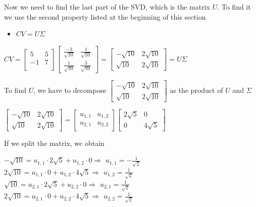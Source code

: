 Now we need to find the last part of the SVD, which is the matrix $ U $. To find it we use the second property listed at the beginning of this section\\
\begin{itemize}
	\item $CV=U\Sigma$
\end{itemize}
\begin{center}
	$ CV=\begin{bmatrix}
		5 &   5 \\
		-1  &  7 \\
	\end{bmatrix}\begin{bmatrix}
	\frac{-3}{\sqrt{10}} & \frac{1}{\sqrt{10}}\\
	\frac{1}{\sqrt{10}} &	\frac{3}{\sqrt{10}}
	\end{bmatrix}=\begin{bmatrix}
	-\sqrt{10} & 2\sqrt{10}\\
	\sqrt{10} &	2\sqrt{10}
	\end{bmatrix}=U\Sigma $
\end{center}
To find $U$, we have to decompose $\begin{bmatrix}
-\sqrt{10} & 2\sqrt{10}\\
\sqrt{10} &	2\sqrt{10}
\end{bmatrix}$ as the product of $U$ and $\Sigma$

\begin{center}
	 $\begin{bmatrix}
	 -\sqrt{10} & 2\sqrt{10}\\
	 \sqrt{10} &	2\sqrt{10}
	 \end{bmatrix}= \begin{bmatrix}
	 	u_{1,1} & u_{1,2} \\
	 	u_{2,1} & u_{2,2}
	 \end{bmatrix}\begin{bmatrix}
	 2\sqrt{5} & 0\\
	 0 & 4\sqrt{5}
	 \end{bmatrix}$\\
\end{center}
If we split the matrix, we obtain
\begin{center}
	
	$ -\sqrt{10}=	u_{1,1} \cdot 2\sqrt{5} + u_{1,2} \cdot 0$\quad $ \Longrightarrow $ \quad $ 	u_{1,1}=-\frac{1}{\sqrt{2}} $\\
	
	$2\sqrt{10}=	u_{1,1} \cdot 0 + u_{1,2} \cdot 4\sqrt{5}$\quad $ \Longrightarrow $ \quad $ 	u_{1,2}=\frac{1}{\sqrt{2}} $\\
	
	$ \sqrt{10}=	u_{2,1} \cdot 2\sqrt{5} + u_{2,2} \cdot 0$\quad $ \Longrightarrow $ \quad $ 	u_{2,1}=\frac{1}{\sqrt{2}} $\\
	
	$2\sqrt{10}=	u_{2,1} \cdot 0 + u_{2,2} \cdot 4\sqrt{5}$\quad $ \Longrightarrow $ \quad $ 	u_{2,2}=\frac{1}{\sqrt{2}} $\\
\end{center}

